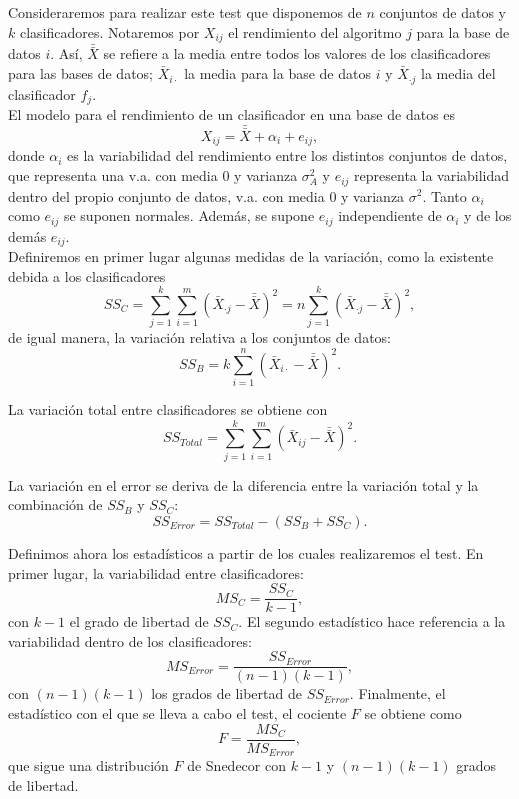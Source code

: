 	Consideraremos para realizar este test que disponemos de 
$n$ conjuntos de datos y $k$ clasificadores. Notaremos por 
$X_{ij}$ el rendimiento del algoritmo $j$ para la base de 
datos $i$. Así, $\bar{\bar{X}}$ se refiere a la media entre 
todos los valores de los clasificadores para las bases de
datos; $\bar{X}_{i \cdot}$ la media para la base de datos $i$ 
y $\bar{X}_{\cdot j}$ la media del clasificador $f_j$.\\
	El modelo para el rendimiento de un clasificador en una 
base de datos es
	\[
		X_{ij} = \bar{\bar{X}} + \alpha_i + e_{ij},
	\]
	donde $\alpha_i$ es la variabilidad del rendimiento entre 
los distintos conjuntos de datos, que representa una v.a. con media 0 y
varianza $\sigma_A^2$ y $e_{ij}$ representa la variabilidad
dentro del propio conjunto de datos, v.a. con media 
0 y varianza $\sigma^2$. Tanto $\alpha_i$ como
$e_{ij}$ se suponen normales. Además, se supone $e_{ij}$ 
independiente de $\alpha_i$ y de los demás $e_{ij}$.\\
	Definiremos en primer lugar algunas medidas de la 
variación, como la existente debida a los clasificadores
	\[ 
		SS_C = \sum\limits_{j=1}^k
				 \sum\limits_{i=1}^m
					\left( \bar{X}_{\cdot j} - 
						   \bar{\bar{X}} \right)^2 =
				n \sum\limits_{j=1}^k
					\left( \bar{X}_{\cdot j} - 
					  	   \bar{\bar{X}} \right)^2,
	\]
	de igual manera, la variación relativa a los conjuntos de
datos:
	\[ 
		SS_B = k \sum\limits_{i=1}^n
					\left( \bar{X}_{i \cdot} - 
					  	   \bar{\bar{X}} \right)^2.
	\]
	
	La variación total entre clasificadores se obtiene con
	\[
		SS_{Total} =  
			\sum\limits_{j=1}^k
				\sum\limits_{i=1}^m
					\left( \bar{X}_{ij} - 
						   \bar{\bar{X}} \right)^2.
	\]
			
	La variación en el error se deriva de la diferencia entre 
la variación total y la combinación de $SS_B$ y $SS_C$:
	\[
		SS_{Error} = SS_{Total} - (SS_B + SS_C).
	\]
	
	Definimos ahora los estadísticos a partir de los cuales 
realizaremos el test. En primer lugar, la variabilidad entre
clasificadores:
	\[
		MS_C = \frac{SS_C}{k-1},
	\]
	con $k-1$ el grado de libertad de $SS_C$. El segundo 
estadístico hace referencia a la variabilidad dentro de los 
clasificadores:
	\[
		MS_{Error} = \frac{SS_{Error}}{(n-1)(k-1)},
	\]
	con $(n-1)(k-1)$ los grados de libertad de $SS_{Error}$.
Finalmente, el estadístico con el que se lleva a cabo el
test, el cociente $F$ se obtiene como
	\[
		F = \frac{MS_C}{MS_{Error}},
	\]
	que sigue una distribución $F$ de Snedecor con $k-1$ y
$(n-1)(k-1)$ grados de libertad.

